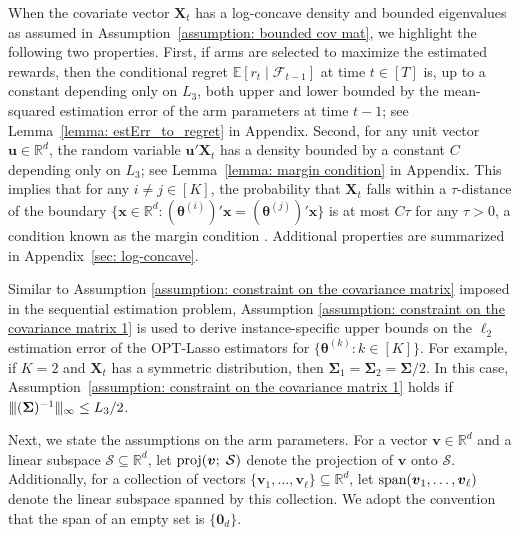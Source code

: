 \documentclass[aos,preprint]{imsart}
\theoremstyle{plain}
\theoremstyle{definition}
\newcommand{\btheta}{\boldsymbol{\theta}}
\newcommand{\bd}[1]{\boldsymbol{#1}}
\newcommand{\bX}{\boldsymbol{X}}
\newcommand{\bSigma}{\boldsymbol{\Sigma}}
\newcommand{\mn}{\vert\kern-0.25ex \vert\kern-0.25ex \vert}
\newcommand{\bu}{\boldsymbol{u}}
\newcommand{\bv}{\boldsymbol{v}}
\newcommand{\bx}{\boldsymbol{x}}
\newcommand{\bR}{\mathbb{R}}
\newcommand{\Exp}{\mathbb{E}}
\begin{document}
When the covariate vector $\bX_t$ has a log-concave density and bounded eigenvalues as assumed in Assumption~\ref{assumption: bounded cov mat}, we highlight the following two properties.  First, if arms are selected to maximize the estimated rewards, then the conditional regret $\Exp[r_t \mid \mathcal{F}_{t-1}]$ at time $t \in [T]$ is, up to a constant depending only on $L_3$, both upper and lower bounded by the mean-squared estimation error of the arm parameters at time $t-1$; see Lemma~\ref{lemma: estErr_to_regret} in Appendix.  Second, for any unit vector $\bu \in \bR^{d}$, the random variable $\bu' \bX_t$ has a density bounded by a constant $C$ depending only on $L_3$; see Lemma~\ref{lemma: margin condition} in Appendix. This implies that for any $i \neq j \in [K]$, the probability that $\bX_t$ falls within a $\tau$-distance of the  boundary 
$\{ \bx \in \bR^{d} : (\btheta^{(i)})'\bx = (\btheta^{(j)})' \bx \}$ 
is at most $C \tau$ for any $\tau > 0$, a condition known as the margin condition \citep{goldenshluger2013linear, bastani2020online}. 
Additional properties are summarized in Appendix~\ref{sec: log-concave}.


Similar to Assumption \ref{assumption: constraint on the covariance matrix} imposed in the sequential estimation problem, Assumption \ref{assumption: constraint on the covariance matrix 1} is used to derive instance-specific upper bounds on the $\ell_2$ estimation error of the OPT-Lasso estimators for $\{\btheta^{(k)} : k \in [K]\}$. 
For example, if $K = 2$ and $\bX_t$ has a symmetric distribution, then $\bSigma_1 = \bSigma_2 = \bSigma/2$. In this case, Assumption~\ref{assumption: constraint on the covariance matrix 1} holds if $\mn (\bSigma)^{-1} \mn_{\infty} \leq L_3/2$.



  

Next, we state the assumptions on the arm parameters. For a vector $\bv \in \mathbb{R}^d$ and a linear subspace $\mathcal{S} \subseteq \mathbb{R}^d$, let $\textup{proj}(\bv;\; \mathcal{S})$ denote the projection of $\bv$ onto $\mathcal{S}$. Additionally, for a collection of vectors $\{\bv_1, \ldots, \bv_{\ell}\} \subseteq \mathbb{R}^d$, let $\textup{span}(\bv_1, \ldots, \bv_{\ell})$ denote the linear subspace spanned by this collection. We adopt the convention that the span of an empty set is $\{\bd{0}_d\}$.


 
 
\end{document}
